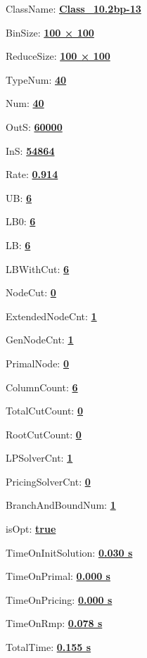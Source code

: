 \documentclass[11pt]{article}
\begin{document}
\pagestyle{empty}


ClassName: \underline{\textbf{Class_10.2bp-13}}
\par
BinSize: \underline{\textbf{100 × 100}}
\par
ReduceSize: \underline{\textbf{100 × 100}}
\par
TypeNum: \underline{\textbf{40}}
\par
Num: \underline{\textbf{40}}
\par
OutS: \underline{\textbf{60000}}
\par
InS: \underline{\textbf{54864}}
\par
Rate: \underline{\textbf{0.914}}
\par
UB: \underline{\textbf{6}}
\par
LB0: \underline{\textbf{6}}
\par
LB: \underline{\textbf{6}}
\par
LBWithCut: \underline{\textbf{6}}
\par
NodeCut: \underline{\textbf{0}}
\par
ExtendedNodeCnt: \underline{\textbf{1}}
\par
GenNodeCnt: \underline{\textbf{1}}
\par
PrimalNode: \underline{\textbf{0}}
\par
ColumnCount: \underline{\textbf{6}}
\par
TotalCutCount: \underline{\textbf{0}}
\par
RootCutCount: \underline{\textbf{0}}
\par
LPSolverCnt: \underline{\textbf{1}}
\par
PricingSolverCnt: \underline{\textbf{0}}
\par
BranchAndBoundNum: \underline{\textbf{1}}
\par
isOpt: \underline{\textbf{true}}
\par
TimeOnInitSolution: \underline{\textbf{0.030 s}}
\par
TimeOnPrimal: \underline{\textbf{0.000 s}}
\par
TimeOnPricing: \underline{\textbf{0.000 s}}
\par
TimeOnRmp: \underline{\textbf{0.078 s}}
\par
TotalTime: \underline{\textbf{0.155 s}}
\par
\newpage


\end{document}
